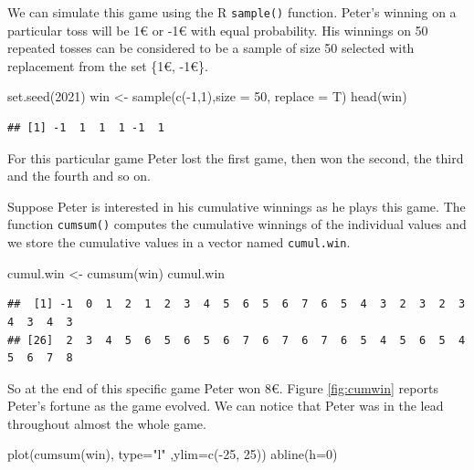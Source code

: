 \documentclass[
]{book}
\newenvironment{Shaded}{\begin{snugshade}}{\end{snugshade}}
\newcommand{\AttributeTok}[1]{\textcolor[rgb]{0.77,0.63,0.00}{#1}}
\newcommand{\DecValTok}[1]{\textcolor[rgb]{0.00,0.00,0.81}{#1}}
\newcommand{\FunctionTok}[1]{\textcolor[rgb]{0.00,0.00,0.00}{#1}}
\newcommand{\NormalTok}[1]{#1}
\newcommand{\OtherTok}[1]{\textcolor[rgb]{0.56,0.35,0.01}{#1}}
\newcommand{\SpecialCharTok}[1]{\textcolor[rgb]{0.00,0.00,0.00}{#1}}
\newcommand{\StringTok}[1]{\textcolor[rgb]{0.31,0.60,0.02}{#1}}
\begin{document}
We can simulate this game using the R \texttt{sample()} function. Peter's winning on a particular toss will be 1€ or -1€ with equal probability. His winnings on 50 repeated tosses can be considered to be a sample of size 50 selected with replacement from the set \{1€, -1€\}.

\begin{Shaded}
\begin{Highlighting}[]
\FunctionTok{set.seed}\NormalTok{(}\DecValTok{2021}\NormalTok{)}
\NormalTok{win }\OtherTok{\textless{}{-}} \FunctionTok{sample}\NormalTok{(}\FunctionTok{c}\NormalTok{(}\SpecialCharTok{{-}}\DecValTok{1}\NormalTok{,}\DecValTok{1}\NormalTok{),}\AttributeTok{size =} \DecValTok{50}\NormalTok{, }\AttributeTok{replace =}\NormalTok{ T)}
\FunctionTok{head}\NormalTok{(win)}
\end{Highlighting}
\end{Shaded}

\begin{verbatim}
## [1] -1  1  1  1 -1  1
\end{verbatim}

For this particular game Peter lost the first game, then won the second, the third and the fourth and so on.

Suppose Peter is interested in his cumulative winnings as he plays this game. The function \texttt{cumsum()} computes the cumulative winnings of the individual values and we store the cumulative values in a vector named \texttt{cumul.win}.

\begin{Shaded}
\begin{Highlighting}[]
\NormalTok{cumul.win }\OtherTok{\textless{}{-}} \FunctionTok{cumsum}\NormalTok{(win) }
\NormalTok{cumul.win}
\end{Highlighting}
\end{Shaded}

\begin{verbatim}
##  [1] -1  0  1  2  1  2  3  4  5  6  5  6  7  6  5  4  3  2  3  2  3  4  3  4  3
## [26]  2  3  4  5  6  5  6  5  6  7  6  7  6  7  6  5  4  5  6  5  4  5  6  7  8
\end{verbatim}

So at the end of this specific game Peter won 8€. Figure \ref{fig:cumwin} reports Peter's fortune as the game evolved. We can notice that Peter was in the lead throughout almost the whole game.

\begin{Shaded}
\begin{Highlighting}[]
\FunctionTok{plot}\NormalTok{(}\FunctionTok{cumsum}\NormalTok{(win), }\AttributeTok{type=}\StringTok{"l"}\NormalTok{ ,}\AttributeTok{ylim=}\FunctionTok{c}\NormalTok{(}\SpecialCharTok{{-}}\DecValTok{25}\NormalTok{, }\DecValTok{25}\NormalTok{))}
\FunctionTok{abline}\NormalTok{(}\AttributeTok{h=}\DecValTok{0}\NormalTok{)}
\end{Highlighting}
\end{Shaded}
\end{document}
